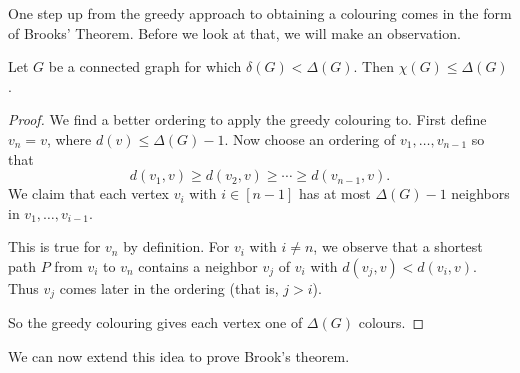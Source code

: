 \documentclass[a4paper]{scrartcl}
\begin{document}
One step up from the greedy approach to obtaining a colouring comes in the form of Brooks' Theorem. Before we look at that, we will make an observation.

\begin{proposition}
	Let $G$ be a connected graph for which $\delta(G) < \Delta(G)$. Then $\chi(G) \leq \Delta(G)$.
\end{proposition}
\begin{proof}
	We find a better ordering to apply the greedy colouring to. First define $v_n = v$, where $d(v) \leq \Delta(G) - 1$. Now choose an ordering of $v_1, \dots, v_{n - 1}$ so that
	$$
	d(v_1, v) \geq d(v_2, v) \geq \cdots \geq d(v_{n - 1}, v).
	$$
	We claim that each vertex $v_i$ with $i \in [n - 1]$ has at most $\Delta(G) - 1$ neighbors in $v_1, \dots, v_{i - 1}$.

	This is true for $v_n$ by definition. For $v_i$ with $i \neq n$, we observe that a shortest path $P$ from $v_i$ to $v_n$ contains a neighbor $v_j$ of $v_i$ with $d(v_j, v) < d(v_i, v)$. Thus $v_j$ comes later in the ordering (that is, $j > i$).

	So the greedy colouring gives each vertex one of $\Delta(G)$ colours.
\end{proof}

We can now extend this idea to prove Brook's theorem.
\end{document}
